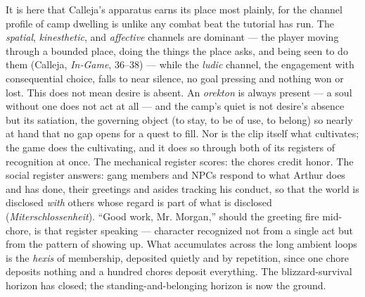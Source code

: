 It is here that Calleja's apparatus earns its place most plainly, for the channel profile of camp dwelling is unlike any combat beat the tutorial has run. The \textit{spatial}, \textit{kinesthetic}, and \textit{affective} channels are dominant — the player moving through a bounded place, doing the things the place asks, and being seen to do them (Calleja, \textit{In-Game}, 36–38) — while the \textit{ludic} channel, the engagement with consequential choice, falls to near silence, no goal pressing and nothing won or lost. This does not mean desire is absent. An \textit{orekton} is always present — a soul without one does not act at all — and the camp's quiet is not desire's absence but its satiation, the governing object (to stay, to be of use, to belong) so nearly at hand that no gap opens for a quest to fill. Nor is the clip itself what cultivates; the game does the cultivating, and it does so through both of its registers of recognition at once. The mechanical register scores: the chores credit honor. The social register answers: gang members and NPCs respond to what Arthur does and has done, their greetings and asides tracking his conduct, so that the world is disclosed \textit{with} others whose regard is part of what is disclosed (\textit{Miterschlossenheit}). ``Good work, Mr. Morgan,'' should the greeting fire mid-chore, is that register speaking — character recognized not from a single act but from the pattern of showing up. What accumulates across the long ambient loops is the \textit{hexis} of membership, deposited quietly and by repetition, since one chore deposits nothing and a hundred chores deposit everything. The blizzard-survival horizon has closed; the standing-and-belonging horizon is now the ground.

